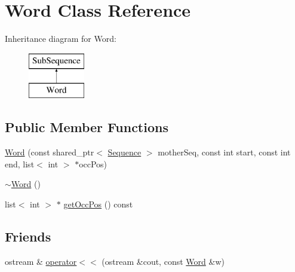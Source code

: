 \hypertarget{classWord}{\section{Word Class Reference}
\label{classWord}
}
Inheritance diagram for Word\-:\begin{figure}[H]
\begin{center}
\leavevmode
\includegraphics[height=2.000000cm]{classWord}
\end{center}
\end{figure}
\subsection*{Public Member Functions}
\begin{DoxyCompactItemize}
\item 
\hyperlink{classWord_ac4331ca9942a6730a472d6fa7c6d8924}{Word} (const shared\-\_\-ptr$<$ \hyperlink{classSequence}{Sequence} $>$ mother\-Seq, const int start, const int end, list$<$ int $>$ $\ast$occ\-Pos)
\item 
\hyperlink{classWord_a1fbcaae6859604d92e94cab540cb3523}{$\sim$\-Word} ()
\item 
list$<$ int $>$ $\ast$ \hyperlink{classWord_ac11d4329ae31c430d38fa37753f21e18}{get\-Occ\-Pos} () const 
\end{DoxyCompactItemize}
\subsection*{Friends}
\begin{DoxyCompactItemize}
\item 
ostream \& \hyperlink{classWord_a0dae9ce1ccead10392c7f5709b047b99}{operator$<$$<$} (ostream \&cout, const \hyperlink{classWord}{Word} \&w)
\end{DoxyCompactItemize}



